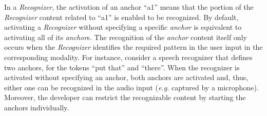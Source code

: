 In a \textit{Recognizer}, the activation of an anchor “a1” means that the
portion of the
\textit{Recognizer} content related to “a1” is enabled to be recognized. By
default, activating a \textit{Recognizer} without specifying a specific
\textit{anchor} is equivalent to activating all of its \textit{anchor}s. The
recognition of the \textit{anchor} content itself only occurs when the
\textit{Recognizer} identifies the required pattern in the user input in the
corresponding modality. For instance, consider a speech recognizer that defines
two anchors, for the tokens “put that” and “there”. When the recognizer is
activated without specifying an anchor, both anchors are activated and, thus,
either one can be recognized in the audio input (\textit{e.g.} captured by a
microphone).
Moreover, the developer can restrict the recognizable content by starting the
anchors individually.

